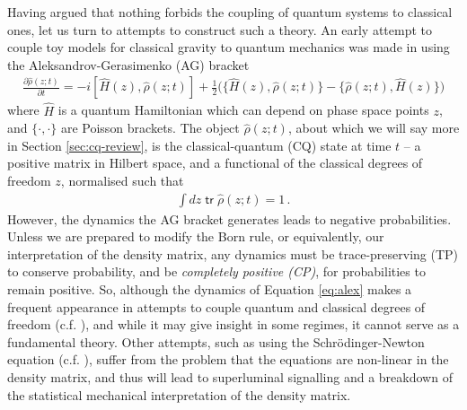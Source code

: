 \documentclass[aps,pra,showpacs,citeautoscript,amsmath,amssymb,floatfix,superscriptaddress,bbm, verbatim,amsfonts,changes,10pt,nofootinbib,longbibliography]{revtex4-1}
\newcommand{\tr}{\mathop{\mathsf{tr}}\nolimits}
\def\z{{z}}
\def\Hq{\hat{H}}
\renewcommand{\varrho}{\hat{\rho}}
\def\psiz{{\varrho(\z;t)}}
\def\PB{\}}
\begin{document}
Having argued that nothing forbids the coupling of quantum systems to classical ones, let us turn to attempts to construct such a theory.
An early attempt to couple toy models for classical gravity to quantum mechanics was made in \cite{boucher1988semiclassical}
using the Aleksandrov-Gerasimenko (AG) bracket\cite{aleksandrov1981statistical,gerasimenko1982dynamical} 
\begin{align}
\frac{\partial \psiz}{\partial t}
=
-i[\Hq(\z),\psiz]+\frac{1}{2}\Big(\{\Hq(\z),\psiz\PB-\{\psiz,\Hq(\z)\PB\Big)
\label{eq:alex}
\end{align}
where $\hat{H}$ is a quantum Hamiltonian which can depend on phase space points $\z$, and $\{\cdot,\cdot\}$ are Poisson brackets. The object $\psiz$, about which we will say more in Section \ref{sec:cq-review}, is the classical-quantum (CQ) state at time $t$ -- a positive matrix in Hilbert space, and a functional of the classical degrees of freedom $\z$, normalised such that
\begin{align}
\int d\z \tr\psiz=1\,.
\label{eq:normalisation}
\end{align}
However, 
the dynamics the AG bracket generates leads to negative probabilities\cite{boucher1988semiclassical,diosi2000quantum}. Unless we are prepared to modify the Born rule, or equivalently, our interpretation of the density matrix, any dynamics must be trace-preserving (TP) to conserve probability, and be {\it completely positive (CP)}, for probabilities to remain positive. So, although the dynamics of Equation \eqref{eq:alex} makes a frequent appearance in attempts to couple quantum and classical degrees of freedom 
\cite{anderson1995quantum,kapral1999mixed,kapral2006progress} (c.f. \cite{prezhdo1997mixing}), and while it may give insight in some regimes, it cannot serve as a fundamental theory. 
Other attempts, such as using the Schr\"odinger-Newton equation\cite{diosi1987universal,penrose1998quantum} (c.f. \cite{pitaevskii1961vortex,gross1961structure}), suffer from the problem that the equations are non-linear in the density matrix, and thus will lead to superluminal signalling\cite{gisin1989stochastic,gisin1990weinberg,polchinski1991weinberg} and a breakdown of the statistical mechanical interpretation of the density matrix\cite{matrix_foot}.\label{par:antag2}
\end{document}
